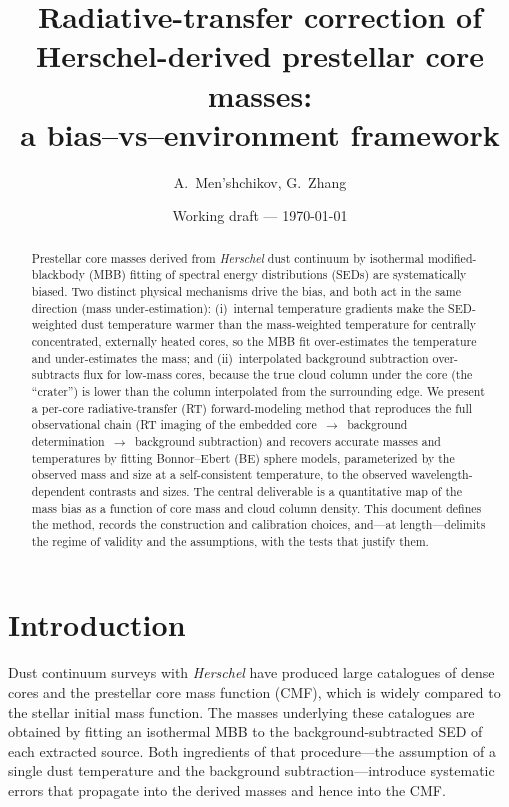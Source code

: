 \documentclass[11pt,a4paper]{article}
\title{\bfseries Radiative-transfer correction of Herschel-derived
prestellar core masses:\\ a bias--vs--environment framework}
\author{A.\ Men'shchikov, G.\ Zhang \note{author list/order TBD}}
\date{Working draft --- \today}
\begin{document}
\maketitle

\begin{abstract}
\noindent
Prestellar core masses derived from \emph{Herschel} dust continuum by
isothermal modified-blackbody (MBB) fitting of spectral energy
distributions (SEDs) are systematically biased. Two distinct physical
mechanisms drive the bias, and both act in the same direction
(mass under-estimation): (i)~internal temperature gradients make the
SED-weighted dust temperature warmer than the mass-weighted temperature
for centrally concentrated, externally heated cores, so the MBB fit
over-estimates the temperature and under-estimates the mass; and
(ii)~interpolated background subtraction over-subtracts flux for low-mass
cores, because the true cloud column under the core (the ``crater'')
is lower than the column interpolated from the surrounding edge.
We present a per-core radiative-transfer (RT) forward-modeling method
that reproduces the full observational chain
(RT imaging of the embedded core~$\rightarrow$~background
determination~$\rightarrow$~background subtraction) and recovers accurate
masses and temperatures by fitting
Bonnor--Ebert (BE) sphere models, parameterized by the observed mass and
size at a self-consistent temperature, to the observed
wavelength-dependent contrasts and sizes. The central deliverable is a
quantitative map of the mass bias as a function of core mass and cloud
column density. This document defines the method, records the
construction and calibration choices, and---at length---delimits the
regime of validity and the assumptions, with the tests that justify them.
\end{abstract}

\section{Introduction}

Dust continuum surveys with \emph{Herschel} have produced large catalogues
of dense cores and the prestellar core mass function (CMF), which is
widely compared to the stellar initial mass function. The masses underlying
these catalogues are obtained by fitting an isothermal MBB to the
background-subtracted SED of each extracted source. Both ingredients of
that procedure---the assumption of a single dust temperature and the
background subtraction---introduce systematic errors that propagate into
the derived masses and hence into the CMF.
\end{document}
